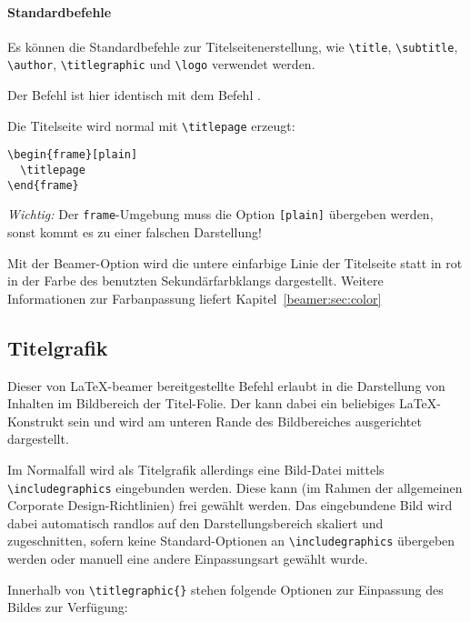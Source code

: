 \paragraph{Standardbefehle}

Es können die Standardbefehle zur Titelseitenerstellung, wie
\lstinline{\title},
\lstinline{\subtitle},
\lstinline{\author},
\lstinline{\titlegraphic}
und \lstinline{\logo} verwendet werden.
\begin{hint}
  Der Befehl  ist hier identisch mit dem Befehl .
\end{hint}

Die Titelseite wird normal mit \lstinline{\titlepage} erzeugt:

\begin{lstlisting}
\begin{frame}[plain]
  \titlepage
\end{frame}
\end{lstlisting}

\emph{Wichtig:} Der \lstinline{frame}-Umgebung muss die Option
\lstinline{[plain]} übergeben werden,
sonst kommt es zu einer falschen Darstellung!

\begin{Declaration}
\end{Declaration}

Mit der Beamer-Option  wird die untere einfarbige Linie
der Titelseite statt in rot in der Farbe des benutzten Sekundärfarbklangs
dargestellt. Weitere Informationen zur Farbanpassung liefert
Kapitel~\ref{beamer:sec:color}


\subsection{Titelgrafik}

\begin{Declaration}
\end{Declaration}

\begin{sloppypar}
Dieser von \LaTeX-beamer bereitgestellte Befehl erlaubt in \tubslatex
die Darstellung von Inhalten im Bildbereich der Titel-Folie.
Der  kann dabei ein beliebiges \LaTeX-Konstrukt sein
und wird am unteren Rande des Bildbereiches ausgerichtet dargestellt.

Im Normalfall wird als Titelgrafik allerdings eine Bild-Datei mittels
\lstinline{\includegraphics} eingebunden werden.
Diese kann (im Rahmen der allgemeinen Corporate Design-Richtlinien)%
frei gewählt werden.
Das eingebundene Bild wird dabei automatisch randlos
auf den Darstellungsbereich skaliert und zugeschnitten, sofern keine
Standard-Optionen an \lstinline{\includegraphics} übergeben werden oder
manuell eine andere Einpassungsart gewählt wurde.

Innerhalb von \lstinline!\titlegraphic{}! stehen folgende
Optionen zur Einpassung des Bildes zur Verfügung:
\end{sloppypar}

